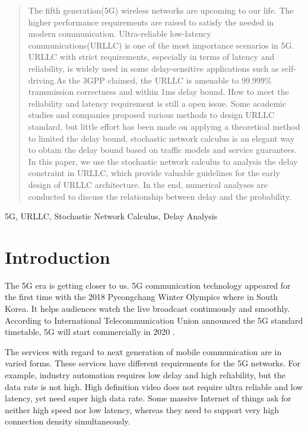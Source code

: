 \documentclass[conference]{IEEEtran}
\begin{document}
\begin{abstract}
The fifth generation(5G) wireless networks are upcoming to our life. The higher performance requirements are raised to satisfy the needed in modern communication.
Ultra-reliable low-latency communications(URLLC) is one of the most importance scenarios in 5G. URLLC with strict requirements, especially in terms of latency and reliability, is widely used in some delay-sensitive applications such as self-driving.As the 3GPP claimed, the URLLC is amenable to 99.999\% transmission correctness and within 1ms delay bound.
How to meet the reliability and latency requirement is still a open issue. Some academic studies and companies proposed various methods to design URLLC standard, but little effort has been made on applying a theoretical method to limited the delay bound.
stochastic network calculus is an elegant way to obtain the delay bound based on traffic models and service guarantees.
In this paper, we use the stochastic network calculus to analysis the delay constraint in URLLC, which provide valuable guidelines for the early design of URLLC architecture.
In the end, numerical analyses are conducted to discuss the relationship between delay and the probability.
\end{abstract}

\begin{IEEEkeywords}
5G, URLLC, Stochastic Network Calculus, Delay Analysis
\end{IEEEkeywords}

\section{Introduction}
The 5G era is getting closer to us. 5G communication technology appeared for the first time with the 2018 Pyeongchang Winter Olympics where in South Korea. It helps audiences watch the live broadcast continuously and smoothly.
According to International Telecommunication Union announced the 5G standard timetable, 5G will start commercially in 2020 \cite{b1}.

The services with regard to next generation of mobile communication are in varied forms. These services have different requirements for the 5G networks. For example, industry automation requires low delay and high reliability, but the data rate is not high. High definition video does not require ultra reliable and low latency, yet need super high data rate. Some massive Internet of things ask for neither high speed nor low latency, whereas they need to support very high connection density simultaneously.
\end{document}
